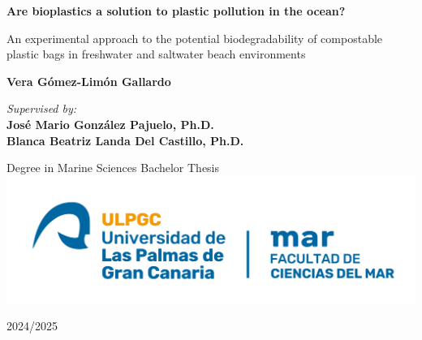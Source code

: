 %
%
%
% 


\begin{center}
    \huge
    \textbf{Are bioplastics a solution to plastic pollution in the ocean?}
        
    \vspace{0.5cm}
    \LARGE
    An experimental approach to the potential biodegradability of compostable plastic bags in freshwater and saltwater beach environments
        
    \vspace{0.5cm}
    \textbf{Vera Gómez-Limón Gallardo}
        
    \vspace{0.5cm}
    \textit{Supervised by:}\\
    \textbf{José Mario González Pajuelo, Ph.D.\\Blanca Beatriz Landa Del Castillo, Ph.D.}
        
    \vfill
        
    Degree in Marine Sciences Bachelor Thesis
    \includegraphics[width=\textwidth]{titlepage/logo.png}
        
    \LARGE
    2024/2025\\
        
\end{center}
	
	